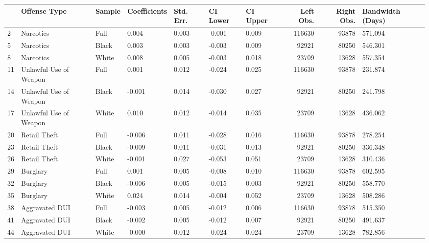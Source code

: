 \begin{tabular}{lllllllrrl}
\toprule
{} &            Offense Type & Sample & Coefficients & Std. Err. & CI Lower & CI Upper &  Left Obs. &  Right Obs. & Bandwidth (Days) \\
\midrule
2  &               Narcotics &   Full &        0.004 &     0.003 &   -0.001 &    0.009 &     116630 &       93878 &          571.094 \\
5  &               Narcotics &  Black &        0.003 &     0.003 &   -0.003 &    0.009 &      92921 &       80250 &          546.301 \\
8  &               Narcotics &  White &        0.008 &     0.005 &   -0.003 &    0.018 &      23709 &       13628 &          557.354 \\
11 &  Unlawful Use of Weapon &   Full &        0.001 &     0.012 &   -0.024 &    0.025 &     116630 &       93878 &          231.874 \\
14 &  Unlawful Use of Weapon &  Black &       -0.001 &     0.014 &   -0.030 &    0.027 &      92921 &       80250 &          241.798 \\
17 &  Unlawful Use of Weapon &  White &        0.010 &     0.012 &   -0.014 &    0.035 &      23709 &       13628 &          436.062 \\
20 &            Retail Theft &   Full &       -0.006 &     0.011 &   -0.028 &    0.016 &     116630 &       93878 &          278.254 \\
23 &            Retail Theft &  Black &       -0.009 &     0.011 &   -0.031 &    0.013 &      92921 &       80250 &          336.348 \\
26 &            Retail Theft &  White &       -0.001 &     0.027 &   -0.053 &    0.051 &      23709 &       13628 &          310.436 \\
29 &                Burglary &   Full &        0.001 &     0.005 &   -0.008 &    0.010 &     116630 &       93878 &          602.595 \\
32 &                Burglary &  Black &       -0.006 &     0.005 &   -0.015 &    0.003 &      92921 &       80250 &          558.770 \\
35 &                Burglary &  White &        0.024 &     0.014 &   -0.004 &    0.052 &      23709 &       13628 &          508.286 \\
38 &          Aggravated DUI &   Full &       -0.003 &     0.005 &   -0.012 &    0.006 &     116630 &       93878 &          515.350 \\
41 &          Aggravated DUI &  Black &       -0.002 &     0.005 &   -0.012 &    0.007 &      92921 &       80250 &          491.637 \\
44 &          Aggravated DUI &  White &       -0.000 &     0.012 &   -0.024 &    0.024 &      23709 &       13628 &          782.856 \\
\bottomrule
\end{tabular}
